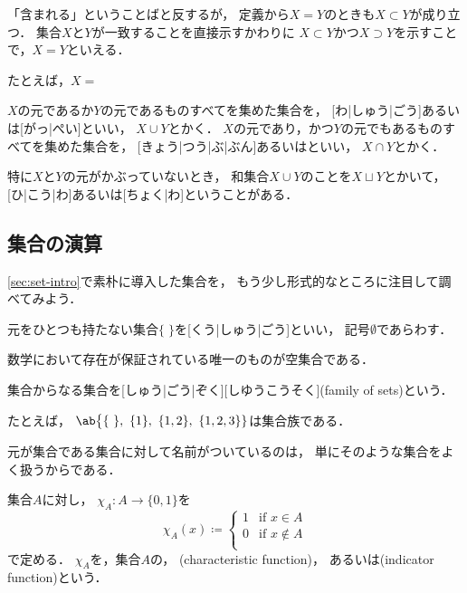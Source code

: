 \documentclass[../sotsu.tex]{subfiles}
\begin{document}
「含まれる」ということばと反するが，
定義から$X = Y$のときも$X \subset Y$が成り立つ．
集合$X$と$Y$が一致することを直接示すかわりに
$X \subset Y$かつ$X \supset Y$を示すことで，$X = Y$といえる．

たとえば，$X = $

$X$の元であるか$Y$の元であるものすべてを集めた集合を，
[わ|しゅう|ごう]あるいは[がっ|ぺい]といい，
$X \cup Y$とかく．
$X$の元であり，かつ$Y$の元でもあるものすべてを集めた集合を，
[きょう|つう|ぶ|ぶん]あるいはといい，
$X \cap Y$とかく．

特に$X$と$Y$の元がかぶっていないとき，
和集合$X \cup Y$のことを$X \sqcup Y$とかいて，
[ひ|こう|わ]あるいは[ちょく|わ]ということがある．



\subsection{集合の演算}

\cref{sec:set-intro}で素朴に導入した集合を，
もう少し形式的なところに注目して調べてみよう．



\begin{definition}
    \label{dfn:empty-set}
    元をひとつも持たない集合$\{ \; \}$を[くう|しゅう|ごう]といい，
    記号$\emptyset$であらわす．
\end{definition}

数学において存在が保証されている唯一のものが空集合である．



\begin{definition}
    \label{dfn:family-of-sets}
    集合からなる集合を[しゅう|ごう|ぞく][しゆうこうそく](family of sets)という．
\end{definition}

たとえば，
$\ab\big\{ \{ \ \}, \  \{ 1 \}, \  \{ 1, 2 \}, \  \{ 1, 2, 3 \}  \}$は集合族である．

元が集合である集合に対して名前がついているのは，
単にそのような集合をよく扱うからである．


\begin{definition}
    \label{dfn:indicator-function}
    集合$A$に対し，
    $\chi_A \colon A \to \{ 0, 1 \}$を
    \begin{equation}
        \chi_A (x) \coloneq 
        \begin{cases}
            1  &  \text{if } x \in A  \\
            0  &  \text{if } x \notin A  \\
        \end{cases}
    \end{equation}
    で定める．
    $\chi_A$を，集合$A$の，
    (characteristic function)，
    あるいは(indicator function)という．
\end{definition}
\end{document}
